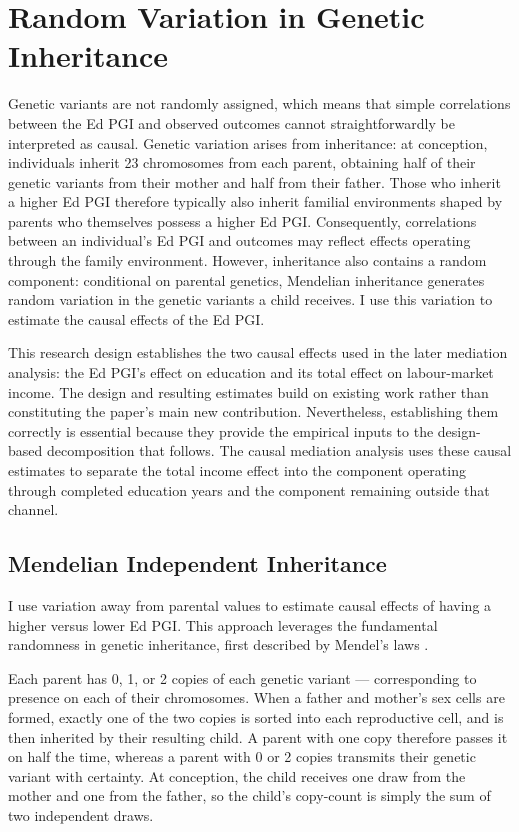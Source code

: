 \section{Random Variation in Genetic Inheritance}
\label{sec:genetics}
Genetic variants are not randomly assigned, which means that simple correlations between the Ed PGI and observed outcomes cannot straightforwardly be interpreted as causal.
Genetic variation arises from inheritance: at conception, individuals inherit 23 chromosomes from each parent, obtaining half of their genetic variants from their mother and half from their father.
Those who inherit a higher Ed PGI therefore typically also inherit familial environments shaped by parents who themselves possess a higher Ed PGI.
Consequently, correlations between an individual's Ed PGI and outcomes may reflect effects operating through the family environment.
However, inheritance also contains a random component: conditional on parental genetics, Mendelian inheritance generates random variation in the genetic variants a child receives.
I use this variation to estimate the causal effects of the Ed PGI.

This research design establishes the two causal effects used in the later mediation analysis: the Ed PGI's effect on education and its total effect on labour-market income.
The design and resulting estimates build on existing work rather than constituting the paper's main new contribution.
Nevertheless, establishing them correctly is essential because they provide the empirical inputs to the design-based decomposition that follows.
The causal mediation analysis uses these causal estimates to separate the total income effect into the component operating through completed education years and the component remaining outside that channel.

\subsection{Mendelian Independent Inheritance}
I use variation away from parental values to estimate causal effects of having a higher versus lower Ed PGI.
This approach leverages the fundamental randomness in genetic inheritance, first described by Mendel's laws \citep{mendel1865versuche}.

Each parent has 0, 1, or 2 copies of each genetic variant --- corresponding to presence on each of their chromosomes.
When a father and mother's sex cells are formed, exactly one of the two copies is sorted into each reproductive cell, and is then inherited by their resulting child.
A parent with one copy therefore passes it on half the time, whereas a parent with 0 or 2 copies transmits their genetic variant with certainty.
At conception, the child receives one draw from the mother and one from the father, so the child's copy-count is simply the sum of two independent draws.

